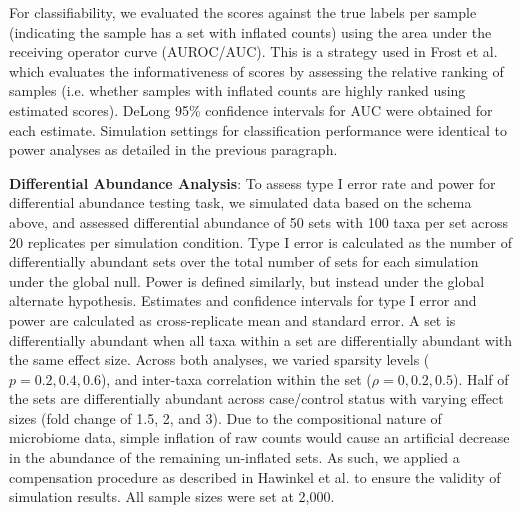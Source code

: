 \documentclass[10pt,letterpaper]{article}
\begin{document}
For classifiability, we evaluated the scores against the true labels per sample (indicating the sample has a set with inflated counts) using the area under the receiving operator curve (AUROC/AUC). This is a strategy used in Frost et al. \cite{frost2020a} which evaluates the informativeness of scores by assessing the relative ranking of samples (i.e. whether samples with inflated counts are highly ranked using estimated scores).  DeLong 95\% confidence intervals for AUC \cite{delong1988} were obtained for each estimate. Simulation settings for classification performance were identical to power analyses as detailed in the previous paragraph. 

\noindent \textbf{Differential Abundance Analysis}: To assess type I error rate and power for differential abundance testing task, we simulated data based on the schema above, and assessed differential abundance of 50 sets with 100 taxa per set across 20 replicates per simulation condition. Type I error is calculated as the number of differentially abundant sets over the total number of sets for each simulation under the global null. Power is defined similarly, but instead under the global alternate hypothesis. Estimates and confidence intervals for type I error and power are calculated as cross-replicate mean and standard error. A set is differentially abundant when all taxa within a set are differentially abundant with the same effect size. Across both analyses, we varied sparsity levels ($p = 0.2, 0.4, 0.6$), and inter-taxa correlation within the set ($\rho = 0, 0.2, 0.5$). Half of the sets are differentially abundant across case/control status with varying effect sizes (fold change of 1.5, 2, and 3). Due to the compositional nature of microbiome data, simple inflation of raw counts would cause an artificial decrease in the abundance of the remaining un-inflated sets. As such, we applied a compensation procedure as described in Hawinkel et al. \cite{hawinkel2019} to ensure the validity of simulation results. All sample sizes were set at 2,000.    
\end{document}
